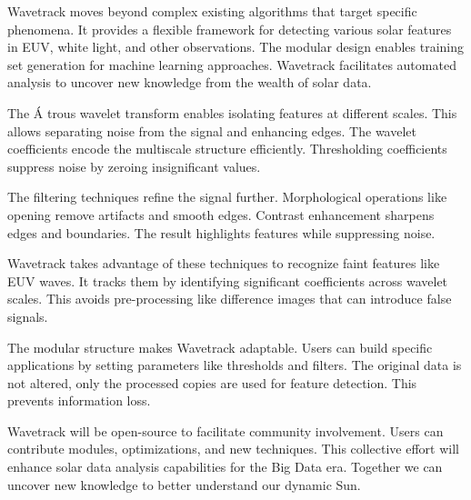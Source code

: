 Wavetrack moves beyond complex existing algorithms that target specific phenomena. It provides a flexible framework for detecting various solar features in EUV, white light, and other observations. The modular design enables training set generation for machine learning approaches. Wavetrack facilitates automated analysis to uncover new knowledge from the wealth of solar data.

The \'A trous wavelet transform enables isolating features at different scales. This allows separating noise from the signal and enhancing edges. The wavelet coefficients encode the multiscale structure efficiently. Thresholding coefficients suppress noise by zeroing insignificant values.

The filtering techniques refine the signal further. Morphological operations like opening remove artifacts and smooth edges. Contrast enhancement sharpens edges and boundaries. The result highlights features while suppressing noise. 

Wavetrack takes advantage of these techniques to recognize faint features like EUV waves. It tracks them by identifying significant coefficients across wavelet scales. This avoids pre-processing like difference images that can introduce false signals.

The modular structure makes Wavetrack adaptable. Users can build specific applications by setting parameters like thresholds and filters. The original data is not altered, only the processed copies are used for feature detection. This prevents information loss.

Wavetrack will be open-source to facilitate community involvement. Users can contribute modules, optimizations, and new techniques. This collective effort will enhance solar data analysis capabilities for the Big Data era. Together we can uncover new knowledge to better understand our dynamic Sun.




